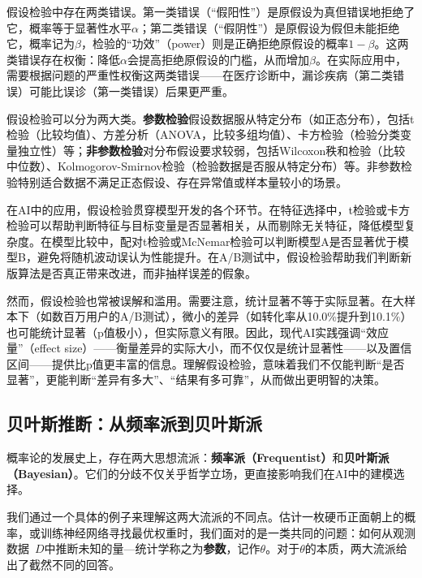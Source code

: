 假设检验中存在两类错误。第一类错误（``假阳性''）是原假设为真但错误地拒绝了它，概率等于显著性水平$\alpha$；第二类错误（``假阴性''）是原假设为假但未能拒绝它，概率记为$\beta$，检验的``功效''（power）则是正确拒绝原假设的概率$1-\beta$。这两类错误存在权衡：降低$\alpha$会提高拒绝原假设的门槛，从而增加$\beta$。在实际应用中，需要根据问题的严重性权衡这两类错误——在医疗诊断中，漏诊疾病（第二类错误）可能比误诊（第一类错误）后果更严重。

假设检验可以分为两大类。\textbf{参数检验}假设数据服从特定分布（如正态分布），包括t检验（比较均值）、方差分析（ANOVA，比较多组均值）、卡方检验（检验分类变量独立性）等；\textbf{非参数检验}对分布假设要求较弱，包括Wilcoxon秩和检验（比较中位数）、Kolmogorov-Smirnov检验（检验数据是否服从特定分布）等。非参数检验特别适合数据不满足正态假设、存在异常值或样本量较小的场景。

在AI中的应用，假设检验贯穿模型开发的各个环节。在特征选择中，t检验或卡方检验可以帮助判断特征与目标变量是否显著相关，从而剔除无关特征，降低模型复杂度。在模型比较中，配对t检验或McNemar检验可以判断模型A是否显著优于模型B，避免将随机波动误认为性能提升。在A/B测试中，假设检验帮助我们判断新版算法是否真正带来改进，而非抽样误差的假象。

然而，假设检验也常被误解和滥用。需要注意，统计显著不等于实际显著。在大样本下（如数百万用户的A/B测试），微小的差异（如转化率从10.0\%提升到10.1\%）也可能统计显著（p值极小），但实际意义有限。因此，现代AI实践强调``效应量''（effect size）——衡量差异的实际大小，而不仅仅是统计显著性——以及置信区间——提供比p值更丰富的信息。理解假设检验，意味着我们不仅能判断``是否显著''，更能判断``差异有多大''、``结果有多可靠''，从而做出更明智的决策。

\subsection{贝叶斯推断：从频率派到贝叶斯派}

概率论的发展史上，存在两大思想流派：\textbf{频率派（Frequentist）}和\textbf{贝叶斯派（Bayesian）}。它们的分歧不仅关乎哲学立场，更直接影响我们在AI中的建模选择。

我们通过一个具体的例子来理解这两大流派的不同点。估计一枚硬币正面朝上的概率，或训练神经网络寻找最优权重时，我们面对的是一类共同的问题：如何从观测数据~$D$中推断未知的量---统计学称之为\textbf{参数}，记作$\theta$。对于$\theta$的本质，两大流派给出了截然不同的回答。

